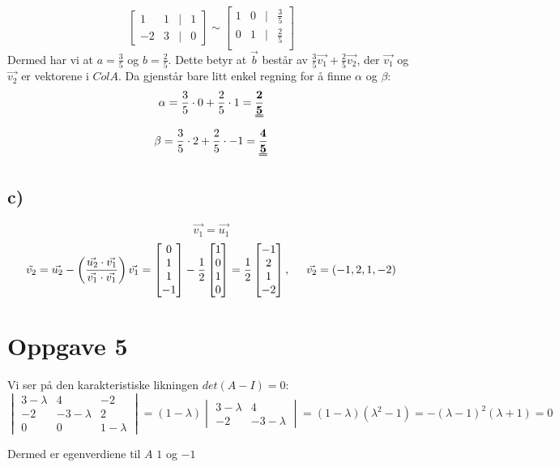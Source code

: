 \documentclass[12pt,norsk,a4paper]{article}
\begin{document}
\begin{equation*}
\begin{bmatrix}
1&1&|&1\\
-2 & 3&|& 0
\end{bmatrix}
\sim
\begin{bmatrix}
1&0&|& \frac{3}{5}\\ 
0&1&|& \frac{2}{5}\\ 
\end{bmatrix}
\end{equation*}
Dermed har vi at $a = \frac{3}{5} $ og $b = \frac{2}{5}$. Dette betyr at $\vec{b}$ består av $\frac{3}{5} \vec{v_1} + \frac{2}{5}\vec{v_2}$, der $\vec{v_1}$ og $\vec{v_2}$ er vektorene i $Col A$.
Da gjenstår bare litt enkel regning for å finne $\alpha $ og $ \beta$:
\begin{equation*}
\alpha = \frac{3}{5} \cdot 0 + \frac{2}{5} \cdot 1 = \mathbf{\uuline{\frac{2}{5}}}
\end{equation*}
\begin{equation*}
\beta = \frac{3}{5} \cdot 2 + \frac{2}{5} \cdot -1 = \mathbf{\uuline{\frac{4}{5}}}
\end{equation*}
\clearpage


\subsection{c)} %
\label{sub:c_}
\[\vec{v_1} = \vec{u_1}\]
\[\tilde{v_2} = \vec{u_2} - \left(\frac{\vec{u_2} \cdot \vec{v_1}}{\vec{v_1}\cdot\vec{v_1}}\right)\vec{v_1} = 
\begin{bmatrix}
0\\1\\1\\-1
\end{bmatrix}
- \frac{1}{2}
\begin{bmatrix}
1\\0\\1\\0 
\end{bmatrix}
= \frac{1}{2} 
\begin{bmatrix}
-1\\2\\1\\-2
\end{bmatrix}, \hspace{0.5cm} \vec{v_2} = (-1,2,1,-2)
 \]

\section{Oppgave 5} %
\label{sec:oppgave_5}
Vi ser på den karakteristiske likningen $det(A - I) = 0$:
\[
\begin{vmatrix}
3-\lambda & 4 & -2\\
-2 & -3-\lambda & 2\\
0&0& 1-\lambda
\end{vmatrix}
= (1-\lambda)
\begin{vmatrix}
3-\lambda & 4\\
-2 & -3-\lambda
\end{vmatrix}
= (1-\lambda)(\lambda^2 -1) = -(\lambda-1)^2(\lambda +1) = 0
\]

Dermed er egenverdiene til $A$ $1$ og $-1$
\end{document}
